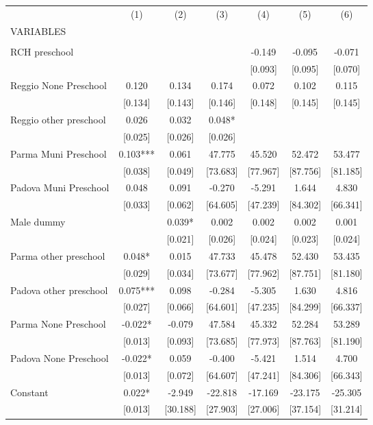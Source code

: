 \begin{tabular}{lcccccc} \hline
 & (1) & (2) & (3) & (4) & (5) & (6) \\
VARIABLES &  &  &  &  &  &  \\ \hline
 &  &  &  &  &  &  \\
RCH preschool &  &  &  & -0.149 & -0.095 & -0.071 \\
 &  &  &  & [0.093] & [0.095] & [0.070] \\
Reggio None Preschool & 0.120 & 0.134 & 0.174 & 0.072 & 0.102 & 0.115 \\
 & [0.134] & [0.143] & [0.146] & [0.148] & [0.145] & [0.145] \\
Reggio other preschool & 0.026 & 0.032 & 0.048* &  &  &  \\
 & [0.025] & [0.026] & [0.026] &  &  &  \\
Parma Muni Preschool & 0.103*** & 0.061 & 47.775 & 45.520 & 52.472 & 53.477 \\
 & [0.038] & [0.049] & [73.683] & [77.967] & [87.756] & [81.185] \\
Padova Muni Preschool & 0.048 & 0.091 & -0.270 & -5.291 & 1.644 & 4.830 \\
 & [0.033] & [0.062] & [64.605] & [47.239] & [84.302] & [66.341] \\
Male dummy &  & 0.039* & 0.002 & 0.002 & 0.002 & 0.001 \\
 &  & [0.021] & [0.026] & [0.024] & [0.023] & [0.024] \\
Parma other preschool & 0.048* & 0.015 & 47.733 & 45.478 & 52.430 & 53.435 \\
 & [0.029] & [0.034] & [73.677] & [77.962] & [87.751] & [81.180] \\
Padova other preschool & 0.075*** & 0.098 & -0.284 & -5.305 & 1.630 & 4.816 \\
 & [0.027] & [0.066] & [64.601] & [47.235] & [84.299] & [66.337] \\
Parma None Preschool & -0.022* & -0.079 & 47.584 & 45.332 & 52.284 & 53.289 \\
 & [0.013] & [0.093] & [73.685] & [77.973] & [87.763] & [81.190] \\
Padova None Preschool & -0.022* & 0.059 & -0.400 & -5.421 & 1.514 & 4.700 \\
 & [0.013] & [0.072] & [64.607] & [47.241] & [84.306] & [66.343] \\
Constant & 0.022* & -2.949 & -22.818 & -17.169 & -23.175 & -25.305 \\
 & [0.013] & [30.188] & [27.903] & [27.006] & [37.154] & [31.214] \\

\end{tabular}
